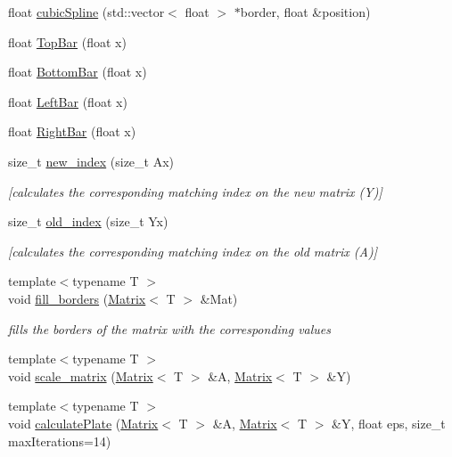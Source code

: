 \begin{DoxyCompactItemize}
float \hyperlink{classanpi_1_1ThermalPlate_a06b979536f63310dc7c7dddd18eca8a5}{cubic\+Spline} (std\+::vector$<$ float $>$ $\ast$border, float \&position)
\item 
float \hyperlink{classanpi_1_1ThermalPlate_a8894638c9cce3fc9b615a6930ca0d8cd}{Top\+Bar} (float x)
\item 
float \hyperlink{classanpi_1_1ThermalPlate_a15aec2411c038bca312b29a5a21a3a75}{Bottom\+Bar} (float x)
\item 
float \hyperlink{classanpi_1_1ThermalPlate_ab3c568d0af480ce66ecce50564d3b464}{Left\+Bar} (float x)
\item 
float \hyperlink{classanpi_1_1ThermalPlate_a227bb49bbfb8de325707360f88a1be01}{Right\+Bar} (float x)
\item 
size\+\_\+t \hyperlink{classanpi_1_1ThermalPlate_a8d8872e95750a5cd5ae6e1a89b60cbd8}{new\+\_\+index} (size\+\_\+t Ax)
\begin{DoxyCompactList}\small\item\em \mbox{[}calculates the corresponding matching index on the new matrix (Y)\mbox{]} \end{DoxyCompactList}\item 
size\+\_\+t \hyperlink{classanpi_1_1ThermalPlate_a249cb0a0909e3d47bbdf9e65db1e6a46}{old\+\_\+index} (size\+\_\+t Yx)
\begin{DoxyCompactList}\small\item\em \mbox{[}calculates the corresponding matching index on the old matrix (A)\mbox{]} \end{DoxyCompactList}\item 
{\footnotesize template$<$typename T $>$ }\\void \hyperlink{classanpi_1_1ThermalPlate_aa971acba23c6ee4e136e095d719b2fe0}{fill\+\_\+borders} (\hyperlink{classanpi_1_1Matrix}{Matrix}$<$ T $>$ \&Mat)
\begin{DoxyCompactList}\small\item\em fills the borders of the matrix with the corresponding values \end{DoxyCompactList}\item 
{\footnotesize template$<$typename T $>$ }\\void \hyperlink{classanpi_1_1ThermalPlate_af85b4a7783b8ff9b4660c8a3e959d0a9}{scale\+\_\+matrix} (\hyperlink{classanpi_1_1Matrix}{Matrix}$<$ T $>$ \&A, \hyperlink{classanpi_1_1Matrix}{Matrix}$<$ T $>$ \&Y)
\item 
{\footnotesize template$<$typename T $>$ }\\void \hyperlink{classanpi_1_1ThermalPlate_af439080df5deeae14923d780e7d7dd3d}{calculate\+Plate} (\hyperlink{classanpi_1_1Matrix}{Matrix}$<$ T $>$ \&A, \hyperlink{classanpi_1_1Matrix}{Matrix}$<$ T $>$ \&Y, float eps, size\+\_\+t max\+Iterations=14)

\end{DoxyCompactItemize}
